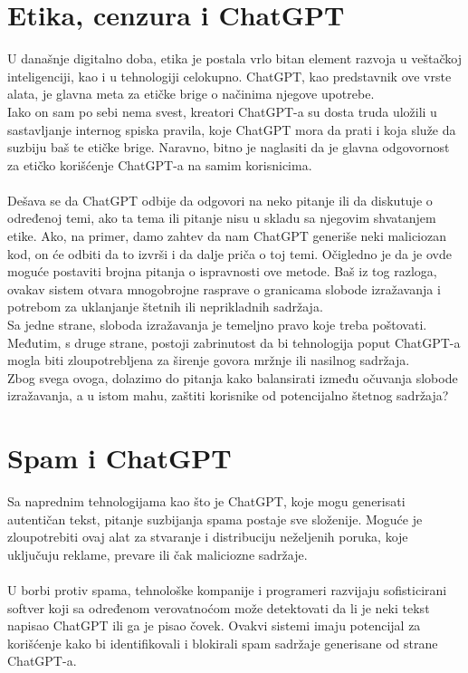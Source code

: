 \documentclass[fleqn, 12pt]{article}
\begin{document}
\section{Etika, cenzura i ChatGPT}
    U današnje digitalno doba, etika je postala vrlo bitan element razvoja u veštačkoj inteligenciji, kao i u tehnologiji celokupno. ChatGPT, kao predstavnik ove vrste alata, je glavna meta za etičke brige o načinima njegove upotrebe.
    \\
    Iako on sam po sebi nema svest, kreatori ChatGPT-a su dosta truda uložili u sastavljanje internog spiska pravila, koje ChatGPT mora da prati i koja služe da suzbiju baš te etičke brige. Naravno, bitno je naglasiti da je glavna odgovornost za etičko korišćenje ChatGPT-a na samim korisnicima.
    \\\\
    Dešava se da ChatGPT odbije da odgovori na neko pitanje ili da diskutuje o određenoj temi, ako ta tema ili pitanje nisu u skladu sa njegovim shvatanjem etike. Ako, na primer, damo zahtev da nam ChatGPT generiše neki maliciozan kod, on će odbiti da to izvrši i da dalje priča o toj temi. Očigledno je da je ovde moguće postaviti brojna pitanja o ispravnosti ove metode. Baš iz tog razloga, ovakav sistem otvara mnogobrojne rasprave o granicama slobode izražavanja i potrebom za uklanjanje štetnih ili neprikladnih sadržaja.
    \\
    Sa jedne strane, sloboda izražavanja je temeljno pravo koje treba poštovati. Međutim, s druge strane, postoji zabrinutost da bi tehnologija poput ChatGPT-a mogla biti zloupotrebljena za širenje govora mržnje ili nasilnog sadržaja.
    \\
    Zbog svega ovoga, dolazimo do pitanja kako balansirati između očuvanja slobode izražavanja, a u istom mahu, zaštiti korisnike od potencijalno štetnog sadržaja?

\section{Spam i ChatGPT}
    Sa naprednim tehnologijama kao što je ChatGPT, koje mogu generisati autentičan tekst, pitanje suzbijanja spama postaje sve složenije. Moguće je zloupotrebiti ovaj alat za stvaranje i distribuciju neželjenih poruka, koje uključuju reklame, prevare ili čak maliciozne sadržaje.
    \\\\
    U borbi protiv spama, tehnološke kompanije i programeri razvijaju sofisticirani softver koji sa određenom verovatnoćom može detektovati da li je neki tekst napisao ChatGPT ili ga je pisao čovek. Ovakvi sistemi imaju potencijal za korišćenje kako bi identifikovali i blokirali spam sadržaje generisane od strane ChatGPT-a.
\newpage
\end{document}
